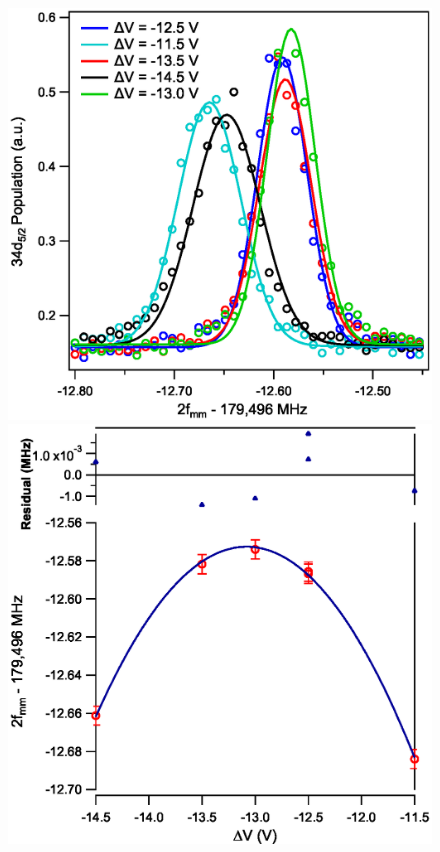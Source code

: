 \documentclass[landscape]{sciposter}
\begin{document}
\begin{multicols}{4}
\begin{figure}
\begin{center}
\includegraphics[scale = 0.8]{nulling.eps}
\includegraphics[scale = 0.8]{deltaV.eps}

\end{center}
\end{figure}
\end{multicols}
\end{document}
